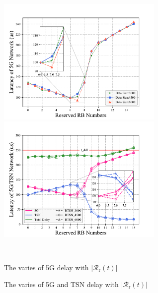\documentclass{SCIS2021}
\begin{document}
	\begin{figure}[t]
		\centering
		\vspace{-0.3cm}
		\begin{minipage}[c]{0.48\textwidth}
			\centering
			\includegraphics[width=8cm]{res_t5g}
		\end{minipage}
		\hspace{0.02\textwidth}
		\begin{minipage}[c]{0.48\textwidth}
			\centering
			\includegraphics[width=8cm]{res_t5g_ttsn}
		\end{minipage}\\[3mm]
		\begin{minipage}[t]{0.48\textwidth}
			\centering 
			\caption{The varies of 5G delay with  $\left|\mathcal{R}_\mathrm{r}(t)\right|$}
			\label{fig:res-5g}
		\end{minipage}
		\hspace{0.02\textwidth}
		\begin{minipage}[t]{0.48\textwidth}
			\centering
			\caption{The varies of 5G and TSN delay with $\left|\mathcal{R}_\mathrm{r}(t)\right|$}
			\label{fig:res-5g/tsn}
		\end{minipage}
		\vspace{-0.3cm}
	\end{figure}
\end{document}
